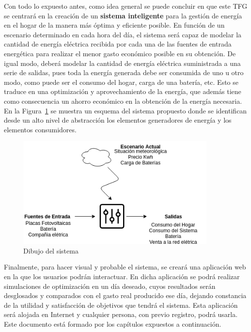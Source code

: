 Con todo lo expuesto antes, como idea general se puede concluir en que este \gls{TFG} se centrará en la creación de un \textbf{sistema inteligente} para la gestión de energía en el hogar de la manera más óptima y eficiente posible. En función de un escenario determinado en cada hora del día, el sistema será capaz de modelar la cantidad de energía eléctrica recibida por cada una de las fuentes de entrada energética para realizar el menor gasto económico posible en su obtención. De igual modo, deberá modelar la cantidad de energía eléctrica suministrada a una serie de salidas, pues toda la energía generada debe ser consumida de uno u otro modo, como puede ser el consumo del hogar, carga de una batería, etc. Esto se traduce en una optimización y aprovechamiento de la energía, que además tiene como consecuencia un ahorro económico en la obtención de la energía necesaria. En la Figura~\ref{fig:abstract} se muestra un esquema del sistema propuesto donde se identifican desde un alto nivel de abstracción los elementos generadores de energía y los elementos consumidores.\\
\begin{figure}[!h]
	\centering
	\includegraphics[width=10cm]{figs/Abstract.png}
	\caption{Dibujo del sistema}
        \label{fig:abstract}
\end{figure}

Finalmente, para hacer visual y probable el sistema, se creará una aplicación web en la que los usuarios podrán interactuar. En dicha aplicación se podrá realizar simulaciones de optimización en un día deseado, cuyos resultados serán desglosados y comparados con el gasto real producido ese día, dejando constancia de la utilidad y satisfacción de objetivos que tendrá el sistema. Esta aplicación será alojada en Internet y cualquier persona, con previo registro, podrá usarla.\\

Este documento está formado por los capítulos expuestos a continuación.

